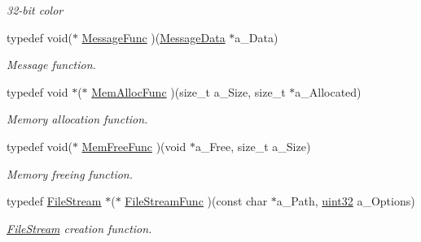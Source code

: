 \begin{DoxyCompactItemize}
\begin{DoxyCompactList}\small\item\em 32-\/bit color \item\end{DoxyCompactList}\item 
typedef void($\ast$ \hyperlink{namespacetil_a4cd3def0937f0e817958cdcc44241549}{MessageFunc} )(\hyperlink{structtil_1_1_message_data}{MessageData} $\ast$a\_\-Data)
\begin{DoxyCompactList}\small\item\em Message function. \item\end{DoxyCompactList}\item 
\hypertarget{namespacetil_a99240dca275f311bbe4c7f93ab1d0a9e}{
typedef void $\ast$($\ast$ \hyperlink{namespacetil_a99240dca275f311bbe4c7f93ab1d0a9e}{MemAllocFunc} )(size\_\-t a\_\-Size, size\_\-t $\ast$a\_\-Allocated)}
\label{namespacetil_a99240dca275f311bbe4c7f93ab1d0a9e}

\begin{DoxyCompactList}\small\item\em Memory allocation function. \item\end{DoxyCompactList}\item 
\hypertarget{namespacetil_af56c2ebf8c7d99cb7740d5edc237a838}{
typedef void($\ast$ \hyperlink{namespacetil_af56c2ebf8c7d99cb7740d5edc237a838}{MemFreeFunc} )(void $\ast$a\_\-Free, size\_\-t a\_\-Size)}
\label{namespacetil_af56c2ebf8c7d99cb7740d5edc237a838}

\begin{DoxyCompactList}\small\item\em Memory freeing function. \item\end{DoxyCompactList}\item 
typedef \hyperlink{classtil_1_1_file_stream}{FileStream} $\ast$($\ast$ \hyperlink{namespacetil_ad2bb0fc50e3103fc00335b66adf272c8}{FileStreamFunc} )(const char $\ast$a\_\-Path, \hyperlink{namespacetil_a20db61688ed403d11f057a508d87e54c}{uint32} a\_\-Options)
\begin{DoxyCompactList}\small\item\em \hyperlink{classtil_1_1_file_stream}{FileStream} creation function. \item\end{DoxyCompactList}\end{DoxyCompactItemize}
